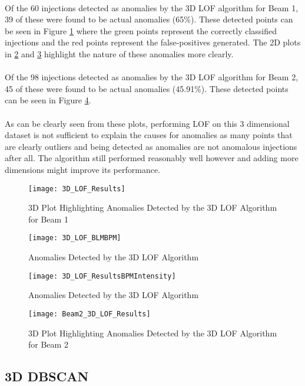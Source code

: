 \paragraph{ }Of the  60 injections detected as anomalies by the 3D \acs{LOF} algorithm for Beam 1, 39 of these were found to be actual anomalies (65\%). These detected points can be seen in Figure \ref{fig::3D_results1} where the green points represent the correctly classified injections and the red points represent the false-positives generated. The 2D plots in \ref{fig::3D_results2} and \ref{fig::3D_results3} highlight the nature of these anomalies more clearly. 

\paragraph{ }Of the 98 injections detected as anomalies by the 3D \acs{LOF} algorithm for Beam 2, 45 of these were found to be actual anomalies (45.91\%). These detected points can be seen in Figure \ref{fig::3D_results1_B2}.

\paragraph{ }As can be clearly seen from these plots, performing \acs{LOF} on this 3 dimensional dataset is not sufficient to explain the causes for anomalies as many points that are clearly outliers and being detected as anomalies are not anomalous injections after all. The algorithm still performed reasonably well however and adding more dimensions might improve its performance.

\begin{figure}[h]
	\centering
	\texttt{[image: 3D\_LOF\_Results]}
	\caption[3D LoF Results Beam 1]{3D Plot Highlighting Anomalies Detected by the 3D LOF Algorithm for Beam 1}
	\label{fig::3D_results1}
\end{figure}  


\begin{figure}[H]
	\centering
	\texttt{[image: 3D\_LOF\_BLMBPM]}
	\caption[3D LoF Results 2]{Anomalies Detected by the 3D LOF Algorithm}
	\label{fig::3D_results2}
\end{figure}  

\begin{figure}[H]
	\centering
	\texttt{[image: 3D\_LOF\_ResultsBPMIntensity]}
	\caption[3D LoF Results 2]{Anomalies Detected by the 3D LOF Algorithm}
	\label{fig::3D_results3}
\end{figure} 

\begin{figure}[H]
	\centering
	\texttt{[image: Beam2\_3D\_LOF\_Results]}
	\caption[3D LoF Results Beam 2]{3D Plot Highlighting Anomalies Detected by the 3D LOF Algorithm for Beam 2}
	\label{fig::3D_results1_B2}
\end{figure}  

\subsection{3D \acs{DBSCAN}}
